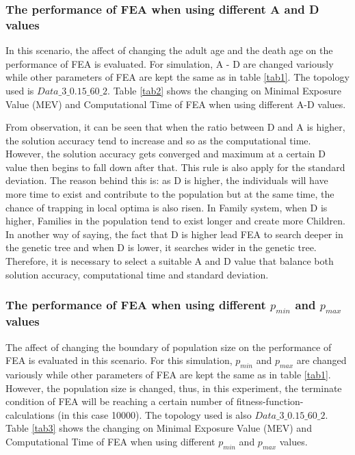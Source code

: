 \documentclass[final]{elsarticle}
\begin{document}
\subsubsection{The performance of FEA when using different A and D values}
In this scenario, the affect of changing the adult age and the death age on the performance of FEA is evaluated. For simulation, A - D are changed variously while other parameters of FEA are kept the same as in table \ref{tab1}. The topology used is $ Data\_3\_0.15\_60\_2 $. Table \ref{tab2} shows the changing on Minimal Exposure Value (MEV) and Computational Time of FEA when using different A-D values.

From observation, it can be seen that when the ratio between D and A is higher, the solution accuracy tend to increase and so as the computational time. However, the solution accuracy gets converged and maximum at a certain D value then begins to fall down after that. This rule is also apply for the standard deviation. The reason behind this is: as D is higher, the individuals will have more time to exist and contribute to the population but at the same time, the chance of trapping in local optima is also risen. In Family system, when D is higher, Families in the population tend to exist longer and create more Children. In another way of saying, the fact that D is higher lead FEA to search deeper in the genetic tree and when D is lower, it searches wider in the genetic tree. Therefore, it is necessary to select a suitable A and D value that balance both solution accuracy, computational time and standard deviation.  

\subsubsection{The performance of FEA when using different $ p_{min} $ and $ p_{max} $ values}
The affect of changing the boundary of population size on the performance of FEA is evaluated in this scenario. For this simulation, $ p_{min} $ and $ p_{max} $ are changed variously while other parameters of FEA are kept the same as in table \ref{tab1}. However, the population size is changed, thus, in this experiment, the terminate condition of FEA will be reaching a certain number of fitness-function-calculations (in this case 10000). The topology used is also $ Data\_3\_0.15\_60\_2 $. Table \ref{tab3} shows the changing on Minimal Exposure Value (MEV) and Computational Time of FEA when using different $ p_{min} $ and $ p_{max} $ values.
\end{document}
